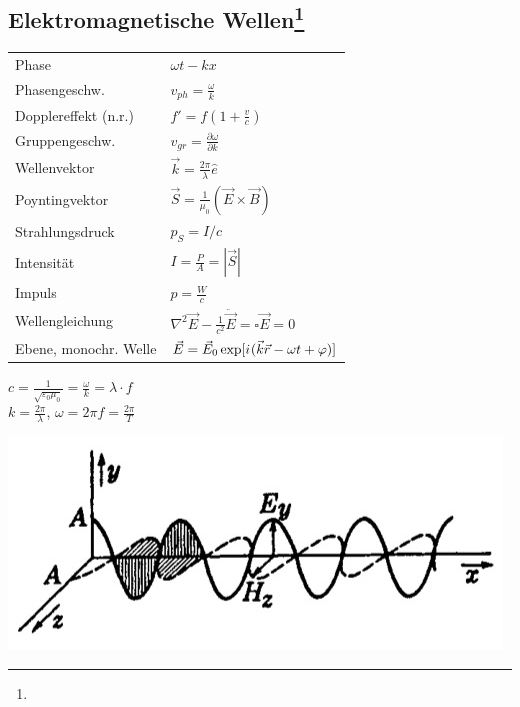 \documentclass[12pt,a4paper]{article}
\newcommand{\iu}{{i\mkern1mu}}
\newcommand{\pd}[2]{\frac{\partial #1}{\partial #2}}
\renewcommand{\=}[1]{\stackrel{#1}{=}}
\newcommand{\ort}{\vec r}
\theoremstyle{definition}
\theoremstyle{remark}
\begin{document}
\subsection[Elektromagnetische Wellen]{Elektromagnetische Wellen\let\thefootnote\relax\footnote{}}
\begin{center}
\begin{minipage}[t]{.49\linewidth}
\vspace{0pt}
\noindent\begin{tabular}{ll}
Phase & $\omega t - k x$\\
Phasengeschw. & $v_{ph} = \frac{\omega}{k}$\\
Dopplereffekt (n.r.) & $f' = f(1+\frac{v}{c})$\\
Gruppengeschw. & $v_{gr} = \pd{\omega}{k}$\\
Wellenvektor & $\vec k = \frac{2 \pi}{\lambda} \hat e$\\
Poyntingvektor & $\vec{S} = \frac{1}{\mu_0}(\vec{E} \times \vec{B})$\\
Strahlungsdruck &  $p_S = I/c$\\
Intensität &  $I = \frac{P}{A} = |\vec{S}|$\\
Impuls &  $p = \frac{W}{c}$\\
Wellengleichung &  $\nabla^2 \vec E - \frac{1}{c^2} \ddot{\vec{E}} = \square \vec E = 0$\\
Ebene, monochr. Welle &  $\vec E = \vec E_0 \exp [\iu(\vec k \ort - \omega t + \varphi)]$\\
\end{tabular}
\end{minipage}%
\begin{minipage}[t]{.49\linewidth}
\vspace{0pt}
\begin{framed}
\begin{center}
$c = \frac{1}{\sqrt{\varepsilon_0 \mu_0}} = \frac{\omega}{k} = \lambda \cdot f$\\
$k = \frac{2\pi}{\lambda}$, $\omega = 2\pi f = \frac{2\pi}{T}$
\end{center}
\end{framed}
\includegraphics[width=\linewidth]{pic/emwelle.png}

\end{minipage}
\end{center}
\end{document}

